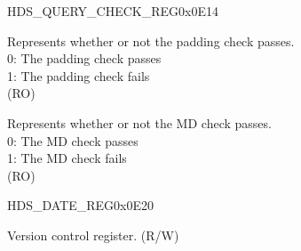 \begin{register}{H}{DS\_QUERY\_CHECK\_REG}{0x0E14}\label{regdesc:DSQUERYCHECKREG}
%
%
%
\regnewline%
\begin{regdesc}\begin{reglist}
\item [DS\_PADDING\_BAD] Represents whether or not the padding check passes.\\
0: The padding check passes\\
1: The padding check fails\\
(RO)
\item [DS\_MD\_ERROR] Represents whether or not the MD check passes.\\
0: The MD check passes\\
1: The MD check fails\\
(RO)
\end{reglist}\end{regdesc}
\end{register}


\begin{register}{H}{DS\_DATE\_REG}{0x0E20}\label{regdesc:DSDATEREG}
%
%
\regnewline%
\begin{regdesc}\begin{reglist}
\item [DS\_DATE] Version control register. (R/W)
\end{reglist}\end{regdesc}
\end{register}
